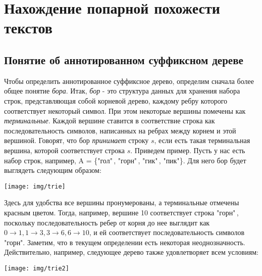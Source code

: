 \section{Нахождение попарной похожести текстов}

\subsection{Понятие об аннотированном суффиксном дереве}
Чтобы определить аннотированное суффиксное дерево, определим сначала более общее понятие \emph{бора}. Итак, \emph{бор} - это структура данных для хранения набора строк, представляющая собой корневой дерево, каждому ребру которого соответствует некоторый символ. При этом некоторые вершины помечены как \emph{терминальные}. Каждой вершине ставится в соответствие строка как последовательность символов, написанных на ребрах между корнем и этой вершиной. Говорят, что бор \emph{принимает} строку $s$, если есть такая терминальная вершина, которой соответствует строка $s$.\newline
Приведем пример. Пусть у нас есть набор строк, например, A = \{"гол"\,, "горн"\,, "гик"\,, "пик"\}. Для него бор будет выглядеть следующим образом:
\begin{center} 
	\texttt{[image: img/trie]}
\end{center}
Здесь для удобства все вершины пронумерованы, а терминальные отмечены красным цветом.\newline
Тогда, например, вершине 10 соответствует строка "горн"\,, поскольку последовательность ребер от корня до нее выглядит как $0 \rightarrow 1, 1 \rightarrow 3, 3 \rightarrow 6, 6 \rightarrow 10$, и ей соответствует последовательность символов "горн". \newline
Заметим, что в текущем определении есть некоторая неоднозначность. Действительно, например, следующее дерево также удовлетворяет всем условиям:
\begin{center} 
	\texttt{[image: img/trie2]}
\end{center}
